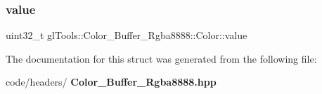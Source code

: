\mbox{\label{structgl_tools_1_1_color___buffer___rgba8888_1_1_color_aa0ece5a450c6e9cd0b14a5854b2896d3}} 
\subsubsection{value}
{\footnotesize\ttfamily uint32\+\_\+t gl\+Tools\+::\+Color\+\_\+\+Buffer\+\_\+\+Rgba8888\+::\+Color\+::value}



The documentation for this struct was generated from the following file\+:\begin{DoxyCompactItemize}
\item 
code/headers/\textbf{ Color\+\_\+\+Buffer\+\_\+\+Rgba8888.\+hpp}\end{DoxyCompactItemize}
